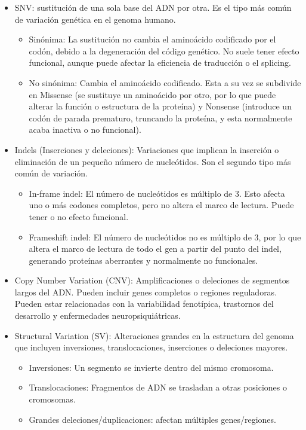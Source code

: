 \documentclass[11pt,spanish,listoffigures,listoftables]{tfgetsinf}
\begin{document}
\begin{itemize}
   \item SNV: sustitución de una sola base del ADN por otra. Es el tipo más común de variación genética en el genoma humano. 
   \begin{itemize}
      \item Sinónima: La sustitución no cambia el aminoácido codificado por el codón, debido a la degeneración del código genético. No suele tener efecto funcional, aunque puede afectar la eficiencia de traducción o el splicing. 
      \item No sinónima: Cambia el aminoácido codificado. Esta a su vez se subdivide en Missense (se sustituye un aminoácido por otro, por lo que puede alterar la función o estructura de la proteína) y Nonsense (introduce un codón de parada prematuro, truncando la proteína, y esta normalmente acaba inactiva o no funcional). 
   \end{itemize}
   
   \item  Indels (Inserciones y deleciones): Variaciones que implican la inserción o eliminación de un pequeño número de nucleótidos. Son el segundo tipo más común de variación.
   \begin{itemize}
      \item In-frame indel: El número de nucleótidos es múltiplo de 3. Esto afecta uno o más codones completos, pero no altera el marco de lectura. Puede tener o no efecto funcional. 
      \item Frameshift indel: El número de nucleótidos no es múltiplo de 3, por lo que altera el marco de lectura de todo el gen a partir del punto del indel, generando proteínas aberrantes y normalmente no funcionales. 
   \end{itemize}
   \item Copy Number Variation (CNV): Amplificaciones o deleciones de segmentos largos del ADN. Pueden incluir genes completos o regiones reguladoras. Pueden estar relacionadas con la variabilidad fenotípica, trastornos del desarrollo y enfermedades neuropsiquiátricas\cite{ZHA}.
   \item Structural Variation (SV): Alteraciones grandes en la estructura del genoma que incluyen inversiones, translocaciones, inserciones o deleciones mayores.
   \begin{itemize}
      \item Inversiones: Un segmento se invierte dentro del mismo cromosoma. 
      \item Translocaciones: Fragmentos de ADN se trasladan a otras posiciones o cromosomas.
      \item Grandes deleciones/duplicaciones: afectan múltiples genes/regiones. 
   \end{itemize}
\end{itemize}
\end{document}
